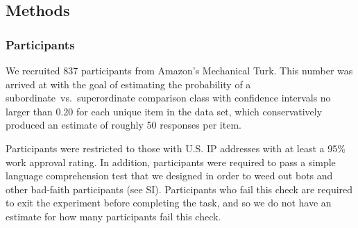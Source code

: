 \documentclass[doc]{apa6}
\newcommand{\red}[1]{\textcolor{Red}{#1}}
\begin{document}









\subsection{Methods}

\subsubsection{Participants}

We recruited 837 participants from Amazon's Mechanical Turk.
This number was arrived at with the goal of estimating the probability of a subordinate~vs.~superordinate comparison class with confidence intervals no larger than 0.20 for each unique item in the data set, which conservatively produced an estimate of roughly 50 responses per item.

Participants were restricted to those with U.S. IP addresses with at least a 95\% work approval rating.
In addition, participants were required to pass a simple language comprehension test that we designed in order to weed out bots and other bad-faith participants (see SI).
Participants who fail this check are required to exit the experiment before completing the task, and so we do not have an estimate for how many participants fail this check.

\end{document}
